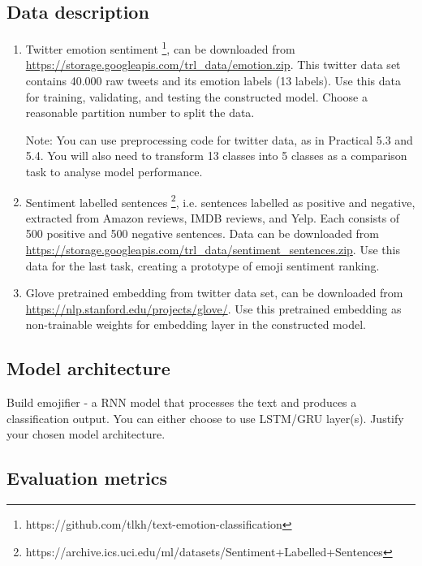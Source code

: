 \documentclass[a4paper,twoside,10pt]{article}
\begin{document}
\subsection*{Data description}

\begin{enumerate}
    \item Twitter emotion sentiment \footnote{https://github.com/tlkh/text-emotion-classification}, can be downloaded from \url{https://storage.googleapis.com/trl_data/emotion.zip}. This twitter data set contains 40.000 raw tweets and its emotion labels (13 labels). Use this data for training, validating, and testing the constructed model. Choose a reasonable partition number to split the data.
    
    Note: You can use preprocessing code for twitter data, as in Practical 5.3 and 5.4. You will also need to transform 13 classes into 5 classes as a comparison task to analyse model performance. 
    
    \item Sentiment labelled sentences \footnote{https://archive.ics.uci.edu/ml/datasets/Sentiment+Labelled+Sentences}, i.e. sentences labelled as positive and negative, extracted from Amazon reviews, IMDB reviews, and Yelp. Each consists of 500 positive and 500 negative sentences. Data can be downloaded from \url{https://storage.googleapis.com/trl_data/sentiment_sentences.zip}. Use this data for the last task, creating a prototype of emoji sentiment ranking.
    
    \item Glove pretrained embedding from twitter data set, can be downloaded from \url{https://nlp.stanford.edu/projects/glove/}. Use this pretrained embedding as non-trainable weights for embedding layer in the constructed model.
    
\end{enumerate}

\subsection*{Model architecture}

Build emojifier - a RNN model that processes the text and produces a classification output. You can either choose to use LSTM/GRU layer(s). Justify your chosen model architecture.

\subsection*{Evaluation metrics}
\end{document}

